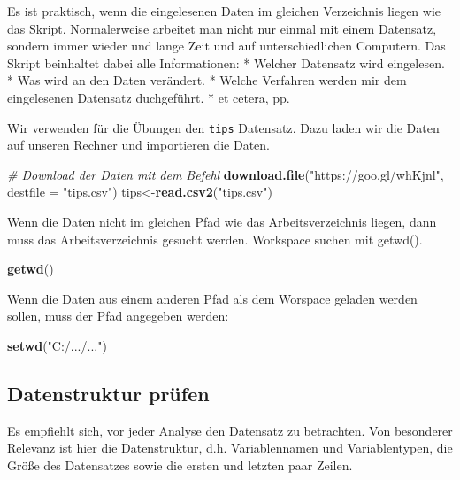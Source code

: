 \documentclass[10pt,ngerman,onside]{article}
\newenvironment{Shaded}{\begin{snugshade}}{\end{snugshade}}
\newcommand{\KeywordTok}[1]{\textcolor[rgb]{0.13,0.29,0.53}{\textbf{#1}}}
\newcommand{\DataTypeTok}[1]{\textcolor[rgb]{0.13,0.29,0.53}{#1}}
\newcommand{\StringTok}[1]{\textcolor[rgb]{0.31,0.60,0.02}{#1}}
\newcommand{\CommentTok}[1]{\textcolor[rgb]{0.56,0.35,0.01}{\textit{#1}}}
\newcommand{\NormalTok}[1]{#1}
\begin{document}
Es ist praktisch, wenn die eingelesenen Daten im gleichen Verzeichnis
liegen wie das Skript. Normalerweise arbeitet man nicht nur einmal mit
einem Datensatz, sondern immer wieder und lange Zeit und auf
unterschiedlichen Computern. Das Skript beinhaltet dabei alle
Informationen: * Welcher Datensatz wird eingelesen. * Was wird an den
Daten verändert. * Welche Verfahren werden mir dem eingelesenen
Datensatz duchgeführt. * et cetera, pp.

Wir verwenden für die Übungen den \texttt{tips} Datensatz. Dazu laden
wir die Daten auf unseren Rechner und importieren die Daten.

\begin{Shaded}
\begin{Highlighting}[]
\CommentTok{# Download der Daten mit dem Befehl}
\KeywordTok{download.file}\NormalTok{(}\StringTok{"https://goo.gl/whKjnl"}\NormalTok{, }\DataTypeTok{destfile =} \StringTok{"tips.csv"}\NormalTok{)}
\NormalTok{tips<-}\KeywordTok{read.csv2}\NormalTok{(}\StringTok{"tips.csv"}\NormalTok{)}
\end{Highlighting}
\end{Shaded}

Wenn die Daten nicht im gleichen Pfad wie das Arbeitsverzeichnis liegen,
dann muss das Arbeitsverzeichnis gesucht werden. Workspace suchen mit
getwd().

\begin{Shaded}
\begin{Highlighting}[]
\KeywordTok{getwd}\NormalTok{()}
\end{Highlighting}
\end{Shaded}

Wenn die Daten aus einem anderen Pfad als dem Worspace geladen werden
sollen, muss der Pfad angegeben werden:

\begin{Shaded}
\begin{Highlighting}[]
\KeywordTok{setwd}\NormalTok{(}\StringTok{"C:/.../..."}\NormalTok{)}
\end{Highlighting}
\end{Shaded}

\hypertarget{datenstruktur-prufen}{%
\subsection{Datenstruktur prüfen}\label{datenstruktur-prufen}}

Es empfiehlt sich, vor jeder Analyse den Datensatz zu betrachten. Von
besonderer Relevanz ist hier die Datenstruktur, d.h. Variablennamen und
Variablentypen, die Größe des Datensatzes sowie die ersten und letzten
paar Zeilen.
\end{document}
